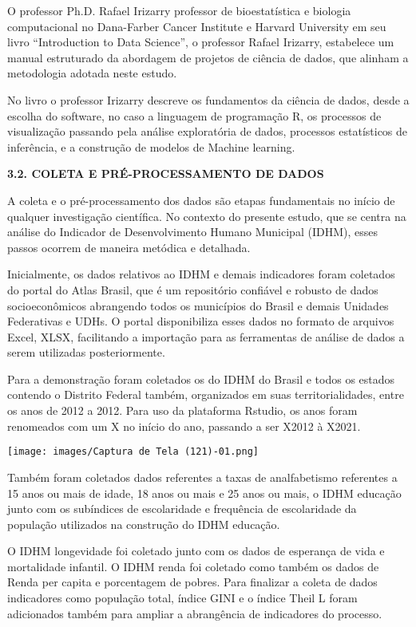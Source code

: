 \documentclass[
]{article}
\begin{document}
O professor Ph.D. Rafael Irizarry professor de bioestatística e biologia
computacional no Dana-Farber Cancer Institute e Harvard University em
seu livro ``Introduction to Data Science'', o professor Rafael Irizarry,
estabelece um manual estruturado da abordagem de projetos de ciência de
dados, que alinham a metodologia adotada neste estudo.

No livro o professor Irizarry descreve os fundamentos da ciência de
dados, desde a escolha do software, no caso a linguagem de programação
R, os processos de visualização passando pela análise exploratória de
dados, processos estatísticos de inferência, e a construção de modelos
de Machine learning.

\textbf{3.2. COLETA E PRÉ-PROCESSAMENTO DE DADOS}

A coleta e o pré-processamento dos dados são etapas fundamentais no
início de qualquer investigação científica. No contexto do presente
estudo, que se centra na análise do Indicador de Desenvolvimento Humano
Municipal (IDHM), esses passos ocorrem de maneira metódica e detalhada.

Inicialmente, os dados relativos ao IDHM e demais indicadores foram
coletados do portal do Atlas Brasil, que é um repositório confiável e
robusto de dados socioeconômicos abrangendo todos os municípios do
Brasil e demais Unidades Federativas e UDHs. O portal disponibiliza
esses dados no formato de arquivos Excel, XLSX, facilitando a importação
para as ferramentas de análise de dados a serem utilizadas
posteriormente.

Para a demonstração foram coletados os do IDHM do Brasil e todos os
estados contendo o Distrito Federal também, organizados em suas
territorialidades, entre os anos de 2012 a 2012. Para uso da plataforma
Rstudio, os anos foram renomeados com um X no início do ano, passando a
ser X2012 à X2021.

\texttt{[image: images/Captura de Tela (121)-01.png]}

Também foram coletados dados referentes a taxas de analfabetismo
referentes a 15 anos ou mais de idade, 18 anos ou mais e 25 anos ou
mais, o IDHM educação junto com os subíndices de escolaridade e
frequência de escolaridade da população utilizados na construção do IDHM
educação.

O IDHM longevidade foi coletado junto com os dados de esperança de vida
e mortalidade infantil. O IDHM renda foi coletado como também os dados
de Renda per capita e porcentagem de pobres. Para finalizar a coleta de
dados indicadores como população total, índice GINI e o índice Theil L
foram adicionados também para ampliar a abrangência de indicadores do
processo.
\end{document}
